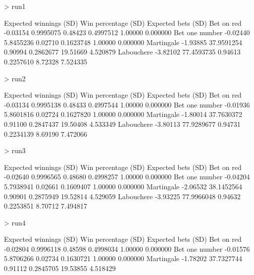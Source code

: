 \documentclass[10pt, oneside, reqno]{article}
\theoremstyle{plain}
\begin{document}
\begin{Schunk}
\begin{Sinput}
> run1
\end{Sinput}
\begin{Soutput}
               Expected winnings       (SD) Win percentage      (SD) Expected bets     (SD)
Bet on red              -0.03154  0.9995075        0.48423 0.4997512       1.00000 0.000000
Bet one number          -0.02440  5.8455236        0.02710 0.1623748       1.00000 0.000000
Martingale              -1.93885 37.9591254        0.90994 0.2862677      19.51669 4.520879
Labouchere              -3.82102 77.4593735        0.94613 0.2257610       8.72328 7.524335
\end{Soutput}
\begin{Sinput}
> run2
\end{Sinput}
\begin{Soutput}
               Expected winnings       (SD) Win percentage      (SD) Expected bets     (SD)
Bet on red              -0.03134  0.9995138        0.48433 0.4997544       1.00000 0.000000
Bet one number          -0.01936  5.8601816        0.02724 0.1627820       1.00000 0.000000
Martingale              -1.80014 37.7630372        0.91100 0.2847437      19.50408 4.533349
Labouchere              -3.80113 77.9289677        0.94731 0.2234139       8.69190 7.472066
\end{Soutput}
\begin{Sinput}
> run3
\end{Sinput}
\begin{Soutput}
               Expected winnings       (SD) Win percentage      (SD) Expected bets     (SD)
Bet on red              -0.02640  0.9996565        0.48680 0.4998257       1.00000 0.000000
Bet one number          -0.04204  5.7938941        0.02661 0.1609407       1.00000 0.000000
Martingale              -2.06532 38.1452564        0.90901 0.2875949      19.52814 4.529059
Labouchere              -3.93225 77.9966048        0.94632 0.2253851       8.70712 7.494817
\end{Soutput}
\begin{Sinput}
> run4
\end{Sinput}
\begin{Soutput}
               Expected winnings       (SD) Win percentage      (SD) Expected bets     (SD)
Bet on red              -0.02804  0.9996118        0.48598 0.4998034       1.00000 0.000000
Bet one number          -0.01576  5.8706266        0.02734 0.1630721       1.00000 0.000000
Martingale              -1.78202 37.7327744        0.91112 0.2845705      19.53855 4.518429

\end{Soutput}
\end{Schunk}
\end{document}
